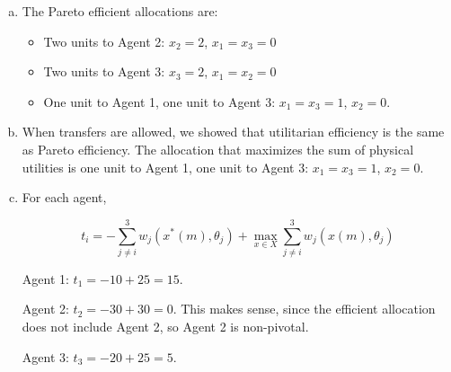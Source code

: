 \documentclass{article}
\begin{document}
\begin{enumerate}[(a)]

	\item

	The Pareto efficient allocations are:

	\begin{itemize}
		\item Two units to Agent 2: $x_2 = 2$, $x_1 = x_3 = 0$
		\item Two units to Agent 3: $x_3 = 2$, $x_1 = x_2 = 0$
		\item One unit to Agent 1, one unit to Agent 3: $x_1 = x_3 = 1$, $x_2 = 0$.
	\end{itemize}

	\item

	When transfers are allowed, we showed that utilitarian efficiency is the same as Pareto efficiency. The allocation that maximizes the sum of physical utilities is one unit to Agent 1, one unit to Agent 3: $x_1 = x_3 = 1$, $x_2 = 0$.

	\item

	For each agent,

	\begin{equation*}
	t_i = -\sum \limits_{j \neq i}^3 w_j(x^*(m), \theta_j) +  \max \limits_{x \in X} \sum \limits_{j \neq i}^3 w_j(x(m), \theta_j)
	\end{equation*}

	Agent 1: $t_1 = -10 + 25 = 15$.

	Agent 2: $t_2 = -30 + 30 = 0$. This makes sense, since the efficient allocation does not include Agent 2, so Agent 2 is non-pivotal.

	Agent 3: $t_3 = -20 + 25 = 5$. 

\end{enumerate}
\end{document}
